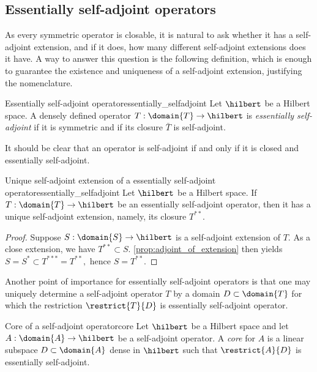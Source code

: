 \subsection{Essentially self-adjoint operators}
As every symmetric operator is closable, it is natural to ask whether it has a self-adjoint extension, and if it does, how many different self-adjoint extensions does it have. A way to answer this question is the following definition, which is enough to guarantee the existence and uniqueness of a self-adjoint extension, justifying the nomenclature.
\begin{definition}{Essentially self-adjoint operator}{essentially_selfadjoint}
    Let \(\hilbert\) be a Hilbert space. A densely defined operator \(T : \domain{T} \to \hilbert\) is \emph{essentially self-adjoint} if it is symmetric and if its closure \(\bar{T}\) is self-adjoint.
\end{definition}
\begin{remark}
    It should be clear that an operator is self-adjoint if and only if it is closed and essentially self-adjoint.
\end{remark}

\begin{proposition}{Unique self-adjoint extension of a essentially self-adjoint operator}{essentially_selfadjoint}
    Let \(\hilbert\) be a Hilbert space. If \(T : \domain{T} \to \hilbert\) be an essentially self-adjoint operator, then it has a unique self-adjoint extension, namely, its closure \(T^{**}.\)
\end{proposition}
\begin{proof}
    Suppose \(S : \domain{S} \to \hilbert\) is a self-adjoint extension of \(T.\) As a close extension, we have \(T^{**} \subset S.\) \cref{prop:adjoint_of_extension} then yields \(S = S^* \subset T^{***} = T^{**},\) hence \(S = T^{**}.\)
\end{proof}
Another point of importance for essentially self-adjoint operators is that one may uniquely determine a self-adjoint operator \(T\) by a domain \(D \subset \domain{T}\) for which the restriction \(\restrict{T}{D}\) is essentially self-adjoint operator.
\begin{definition}{Core of a self-adjoint operator}{core}
    Let \(\hilbert\) be a Hilbert space and let \(A : \domain{A} \to \hilbert\) be a self-adjoint operator. A \emph{core} for \(A\) is a linear subspace \(D \subset \domain{A}\) dense in \(\hilbert\) such that \(\restrict{A}{D}\) is essentially self-adjoint.
\end{definition}

